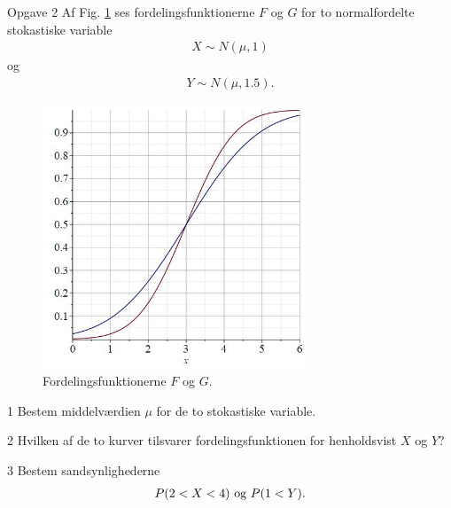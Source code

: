 \documentclass[12pt,x11names,a4paper]{article}
\begin{document}
\begin{opgavetekst}{Opgave 2}
	Af Fig. \ref{fig:fordeling} ses fordelingsfunktionerne $F$ og $G$ for to normalfordelte stokastiske variable
	\begin{align*}
		X \sim N(\mu,1)
	\end{align*}
	og 
	\begin{align*}
		Y \sim N(\mu,1.5).
	\end{align*}
	\begin{figure}[H]
		\centering
		\includegraphics[width=0.7\textwidth]{Billeder/fordelingafl.jpg}
		\caption{Fordelingsfunktionerne $F$ og $G$.}
		\label{fig:fordeling}
	\end{figure}
	\phantom{h}
\end{opgavetekst}
	\begin{delopgave}{}{1}
		Bestem middelværdien $\mu$ for de to stokastiske variable.
	\end{delopgave}
	\begin{delopgave}{}{2}
		Hvilken af de to kurver tilsvarer fordelingsfunktionen for henholdsvist $X$ og $Y$?
	\end{delopgave}
	\begin{delopgave}{}{3}
		Bestem sandsynlighederne
		\begin{align*}
			P(2<X<4) \textnormal{ og } P(1<Y).
		\end{align*}
	\end{delopgave}
\end{document}
